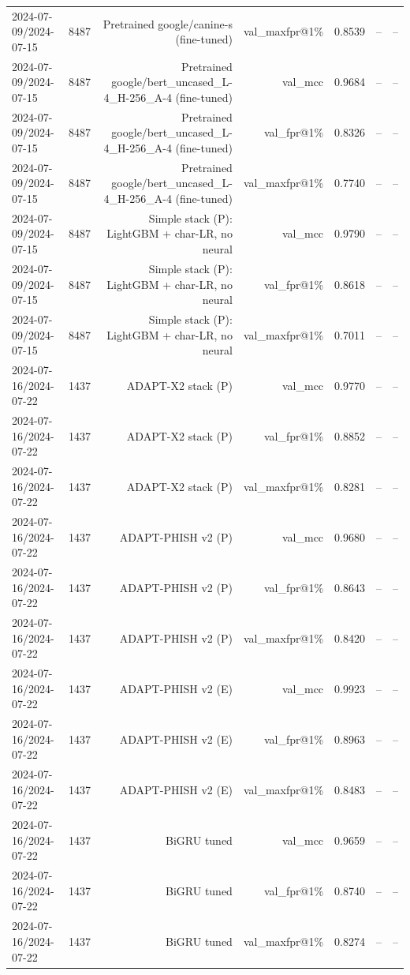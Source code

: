 \begin{table}[t]
\begin{tabular}{llrrrrr}
2024-07-09/2024-07-15 & 8487 & Pretrained google/canine-s (fine-tuned) & val\_maxfpr@1\% & 0.8539 & -- & -- \\
2024-07-09/2024-07-15 & 8487 & Pretrained google/bert\_uncased\_L-4\_H-256\_A-4 (fine-tuned) & val\_mcc & 0.9684 & -- & -- \\
2024-07-09/2024-07-15 & 8487 & Pretrained google/bert\_uncased\_L-4\_H-256\_A-4 (fine-tuned) & val\_fpr@1\% & 0.8326 & -- & -- \\
2024-07-09/2024-07-15 & 8487 & Pretrained google/bert\_uncased\_L-4\_H-256\_A-4 (fine-tuned) & val\_maxfpr@1\% & 0.7740 & -- & -- \\
2024-07-09/2024-07-15 & 8487 & Simple stack (P): LightGBM + char-LR, no neural & val\_mcc & 0.9790 & -- & -- \\
2024-07-09/2024-07-15 & 8487 & Simple stack (P): LightGBM + char-LR, no neural & val\_fpr@1\% & 0.8618 & -- & -- \\
2024-07-09/2024-07-15 & 8487 & Simple stack (P): LightGBM + char-LR, no neural & val\_maxfpr@1\% & 0.7011 & -- & -- \\
2024-07-16/2024-07-22 & 1437 & ADAPT-X2 stack (P) & val\_mcc & 0.9770 & -- & -- \\
2024-07-16/2024-07-22 & 1437 & ADAPT-X2 stack (P) & val\_fpr@1\% & 0.8852 & -- & -- \\
2024-07-16/2024-07-22 & 1437 & ADAPT-X2 stack (P) & val\_maxfpr@1\% & 0.8281 & -- & -- \\
2024-07-16/2024-07-22 & 1437 & ADAPT-PHISH v2 (P) & val\_mcc & 0.9680 & -- & -- \\
2024-07-16/2024-07-22 & 1437 & ADAPT-PHISH v2 (P) & val\_fpr@1\% & 0.8643 & -- & -- \\
2024-07-16/2024-07-22 & 1437 & ADAPT-PHISH v2 (P) & val\_maxfpr@1\% & 0.8420 & -- & -- \\
2024-07-16/2024-07-22 & 1437 & ADAPT-PHISH v2 (E) & val\_mcc & 0.9923 & -- & -- \\
2024-07-16/2024-07-22 & 1437 & ADAPT-PHISH v2 (E) & val\_fpr@1\% & 0.8963 & -- & -- \\
2024-07-16/2024-07-22 & 1437 & ADAPT-PHISH v2 (E) & val\_maxfpr@1\% & 0.8483 & -- & -- \\
2024-07-16/2024-07-22 & 1437 & BiGRU tuned & val\_mcc & 0.9659 & -- & -- \\
2024-07-16/2024-07-22 & 1437 & BiGRU tuned & val\_fpr@1\% & 0.8740 & -- & -- \\
2024-07-16/2024-07-22 & 1437 & BiGRU tuned & val\_maxfpr@1\% & 0.8274 & -- & -- \\

\end{tabular}
\end{table}
